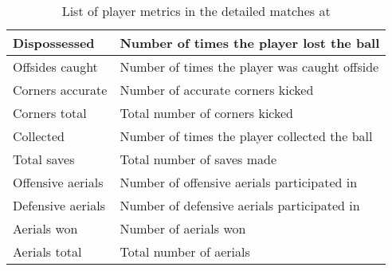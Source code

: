 \begin{table}[H]
\begin{tabulary}{\textwidth}{| L | L |}
        Dispossessed            & Number of times the player lost the ball \\\hline
        Offsides caught         & Number of times the player was caught offside \\\hline
        Corners accurate        & Number of accurate corners kicked \\\hline
        Corners total           & Total number of corners kicked \\\hline
        
        Collected               & Number of times the player collected the ball \\\hline
        Total saves             & Total number of saves made \\\hline
        
        Offensive aerials       & Number of offensive aerials participated in \\\hline
        Defensive aerials       & Number of defensive aerials participated in \\\hline
        Aerials won             & Number of aerials won \\\hline
        Aerials total           & Total number of aerials \\\hline
    \end{tabulary}
    \caption{List of player metrics in the detailed matches at \whoscored}
    \label{tab:whoscored-player-metrics}
\end{table}

